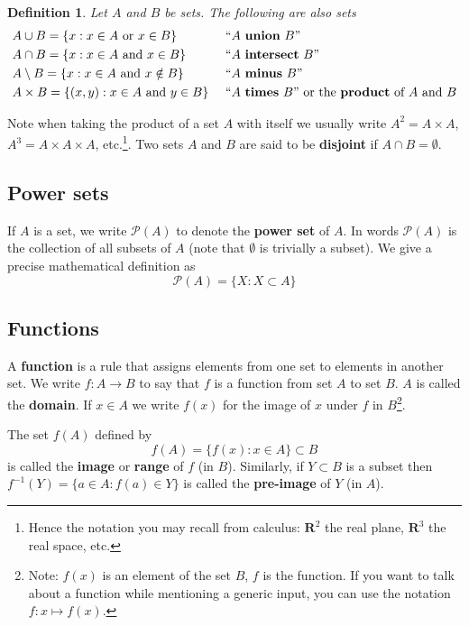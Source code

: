 \documentclass[12pt]{article}
\numberwithin{equation}{subsection}
\newtheorem{defn}[subsection]{Definition}
\theoremstyle{note}
\begin{document}
\begin{defn}
Let $A$ and $B$ be sets. The following are also sets
\begin{align*}
	& A \cup B = \{ x : x\in A \text{ or } x\in B\} &&\text{ ``$A$ \textbf{union} $B$'' }\\
	& A \cap B = \{ x : x\in A \text{ and } x\in B\} &&\text{ ``$A$ \textbf{intersect} $B$'' }\\
	& A \setminus B = \{ x : x\in A \text{ and } x\notin B\}&& \text{ ``$A$ \textbf{minus} $B$'' }\\
	& A\times B = \{ (x,y) : x\in A \text{ and } y\in B\}&& \text{ ``$A$ \textbf{times} $B$'' or the \textbf{product} of $A$ and $B$} 
\end{align*}
\end{defn}

Note when taking the product of a set $A$ with itself we usually write $A^2=A\times A$, $A^3=A\times A\times A$, etc.\footnote{Hence the notation you may recall from calculus: $\mathbf{R}^2$ the real plane, $\mathbf{R}^3$ the real space, etc.}. Two sets $A$ and $B$ are said to be \textbf{disjoint} if $A \cap B = \emptyset$. 

 

\subsection{Power sets} If $A$ is a set, we write $\mathcal{P}(A)$ to denote the \textbf{power set} of $A$. In words $\mathcal{P}(A)$ is the collection of all subsets of $A$ (note that $\emptyset$ is trivially a subset). We give a precise mathematical definition as \begin{equation} \mathcal{P}(A)=\{ X : X\subset A\} \end{equation} 

\subsection{Functions} A \textbf{function} is a rule that assigns elements from one set to elements in another set. We write $f\colon A\to B$ to say that $f$ is a function from set $A$ to set $B$. $A$ is called the \textbf{domain}.  If $x\in A$ we write $f(x)$ for the image of $x$ under $f$ in $B$\footnote{Note: $f(x)$ is an element of the set $B$, $f$ is the function. If you want to talk about a function while mentioning a generic input, you can use the notation $f\colon x\mapsto f(x)$.}.

The set $f(A)$ defined by \[f(A)=\{ f(x) : x\in A\} \subset B\] is called the \textbf{image} or \textbf{range} of $f$ (in $B$). Similarly, if $Y\subset B$ is a subset then $f^{-1}(Y)=\{a\in A: f(a)\in Y\}$ is called the \textbf{pre-image} of $Y$ (in $A$).
\end{document}
